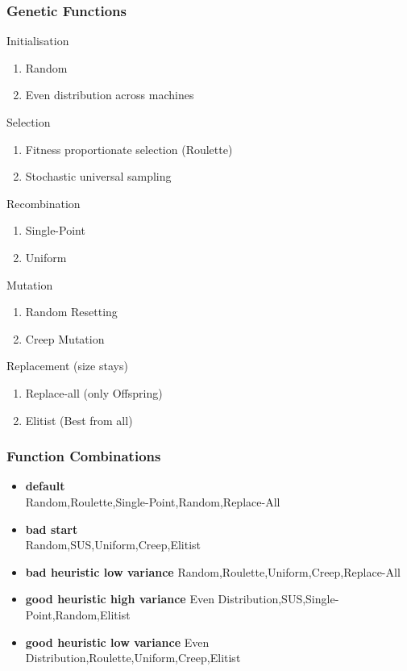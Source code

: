 \documentclass[
]{beamer}
\begin{document}
	\begin{frame}
    	\frametitle{Genetic Functions}
        \begin{minipage}{0.45\textwidth}
        Initialisation
        \begin{enumerate}
            \item Random
            \item Even distribution across machines
        \end{enumerate}
        Selection
        \begin{enumerate}
            \item Fitness proportionate selection (Roulette)
            \item Stochastic universal sampling 
        \end{enumerate}
        Recombination
        \begin{enumerate}
            \item Single-Point
            \item Uniform
        \end{enumerate}
        \end{minipage}%
        \hfill
		\begin{minipage}{0.45\textwidth}
        Mutation
        \begin{enumerate}
        	\item Random Resetting
        	\item Creep Mutation
        \end{enumerate}
        Replacement (size stays)
        \begin{enumerate}
        	\item Replace-all (only Offspring)
        	\item Elitist (Best from all)
        \end{enumerate}
        \end{minipage}%
	\end{frame}
 
	\begin{frame}
    	\frametitle{Function Combinations}
        \begin{itemize}
            \item \textbf{default}\\
            Random,Roulette,Single-Point,Random,Replace-All
            \item \textbf{bad start}\\
            Random,SUS,Uniform,Creep,Elitist
           	\item \textbf{bad heuristic low variance}
            Random,Roulette,Uniform,Creep,Replace-All
            \item \textbf{good heuristic high variance}
            Even Distribution,SUS,Single-Point,Random,Elitist
            \item \textbf{good heuristic low variance}
            Even Distribution,Roulette,Uniform,Creep,Elitist
        \end{itemize}
	\end{frame}
    
\end{document}
